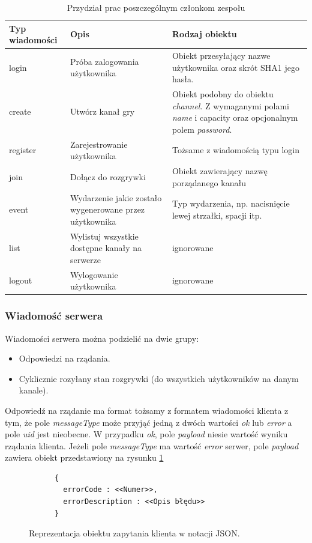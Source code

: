 \begin{table}[h]
  \centering
  \begin{tabular}{ |p{1.5cm}|p{6cm}|p{6cm}| }
    \hline
    \textbf{Typ wiadomości} & \textbf{Opis} & \textbf{Rodzaj obiektu} \\ \hline
    login & Próba zalogowania użytkownika & Obiekt przesyłający nazwe użytkownika oraz skrót SHA1 jego hasła. \\
    create & Utwórz kanał gry & Obiekt podobny do obiektu \emph{channel}. Z wymaganymi polami \emph{name} i {capacity} oraz opcjonalnym polem \emph{password}. \\
    register & Zarejestrowanie użytkownika & Tożsame z wiadomością typu login \\
    join & Dołącz do rozgrywki & Obiekt zawierający nazwę porządanego kanału \\
    event & Wydarzenie jakie zostało wygenerowane przez użytkownika & Typ wydarzenia, np. nacisnięcie lewej strzałki, spacji itp. \\
    list & Wylistuj wszystkie dostępne kanały na serwerze & ignorowane \\
    logout & Wylogowanie użytkownika & ignorowane \\
    \hline
  \end{tabular}
  \caption{Przydział prac poszczególnym członkom zespołu}
  \label{tab:clientmessagestypes}
\end{table}
\subsubsection{Wiadomość serwera}
Wiadomości serwera można podzielić na dwie grupy:
\begin{itemize}
  \item Odpowiedzi na rządania.
  \item Cyklicznie rozyłany stan rozgrywki (do wszystkich użytkowników na danym kanale).
\end{itemize}

Odpowiedź na rządanie ma format tożsamy z formatem wiadomości klienta z tym, że pole \emph{messageType} może przyjąć jedną z dwóch wartości \emph{ok} lub \emph{error} a pole \emph{uid} jest nieobecne. W przypadku \emph{ok}, pole \emph{payload} niesie wartość wyniku rządania klienta. Jeżeli pole \emph{messageType} ma wartość \emph{error} serwer, pole \emph{payload} zawiera obiekt przedstawiony na rysunku \ref{fig:errors}
\begin{figure}[ht]
    \centering
    \begin{verbatim}
      {
        errorCode : <<Numer>>,
        errorDescription : <<Opis błędu>>
      }
      \end{verbatim}
    \caption{Reprezentacja obiektu zapytania klienta w notacji JSON.}
    \label{fig:errors}
\end{figure}

